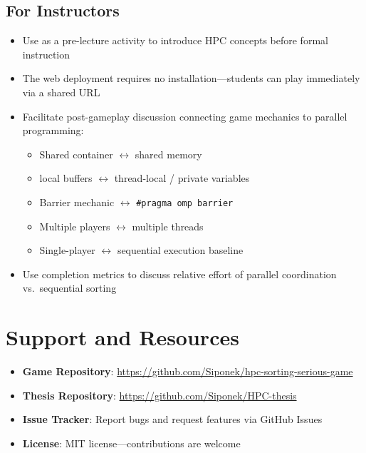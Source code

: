 \subsection{For Instructors}

\begin{itemize}
    \item Use as a pre-lecture activity to introduce HPC concepts before formal instruction
    \item The web deployment requires no installation---students can play immediately via a shared URL
    \item Facilitate post-gameplay discussion connecting game mechanics to parallel programming:
          \begin{itemize}
              \item Shared container $\leftrightarrow$ shared memory
              \item local buffers $\leftrightarrow$ thread-local / private variables
              \item Barrier mechanic $\leftrightarrow$ \texttt{\#pragma omp barrier}
              \item Multiple players $\leftrightarrow$ multiple threads
              \item Single-player $\leftrightarrow$ sequential execution baseline
          \end{itemize}
    \item Use completion metrics to discuss relative effort of parallel coordination vs.\ sequential sorting
\end{itemize}

\section{Support and Resources}
\label{app:a:support}

\begin{itemize}
    \item \textbf{Game Repository}: \url{https://github.com/Siponek/hpc-sorting-serious-game}
    \item \textbf{Thesis Repository}: \url{https://github.com/Siponek/HPC-thesis}
    \item \textbf{Issue Tracker}: Report bugs and request features via GitHub Issues
    \item \textbf{License}: MIT license---contributions are welcome
\end{itemize}

